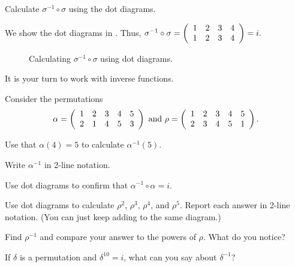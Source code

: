 \begin{exam}
\begin{apart}
            \item Calculate $\sigma^{-1} \circ \sigma$ using the dot diagrams.
                \begin{soln}
                    We show the dot diagrams in .  Thus,
                        $\sigma^{-1} \circ \sigma = 
                        \left(\begin{array} {ccc c}
                            1 & 2 & 3 & 4 \\
                            1 & 2 & 3 & 4
                        \end{array} \right) = i.$
                \end{soln}
                
                \begin{figure}[hbtp]
                    \centering
                    
                    \caption{Calculating $\sigma^{-1} \circ \sigma$ using dot diagrams.}
                    \label{fig_perms_sigma_inv}
                \end{figure}
        \end{apart}
\end{exam}

It is your turn to work with inverse functions.

\begin{act}
\label{act_inv_fns}
    Consider the permutations $$\alpha = \left ( \begin{array} {ccc cc} 1 & 2 & 3 & 4 & 5  \\ 2 & 1 & 4 & 5 & 3 \end{array} \right ) \text{ and } \rho = \left ( \begin{array} {ccc cc} 1 & 2 & 3 & 4 & 5  \\ 2 & 3 & 4 & 5 & 1 \end{array} \right ).$$
    \begin{apart}
        \item Use that $\alpha(4)=5$ to calculate $\alpha^{-1}(5)$.
        \item Write $\alpha^{-1}$ in 2-line notation.
        \item Use dot diagrams to confirm that $\alpha^{-1} \circ \alpha = i$.
        \item Use dot diagrams to calculate $\rho^2$, $\rho^3$, $\rho^4$, and $\rho^5$. Report each answer in 2-line notation. (You can just keep adding to the same diagram.)
        \item Find $\rho^{-1}$ and compare your answer to the powers of $\rho$.  What do you notice?
        \item If $\delta$ is a permutation and $\delta^{10}=i$, what can you say about $\delta^{-1}$?
    \end{apart}
\end{act}

